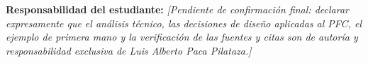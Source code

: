 \documentclass[11pt,a4paper]{article}
\begin{document}
\noindent\textbf{Responsabilidad del estudiante:} \textit{[Pendiente de confirmaci\'on final: declarar expresamente que el an\'alisis t\'ecnico, las decisiones de dise\~no aplicadas al PFC, el ejemplo de primera mano y la verificaci\'on de las fuentes y citas son de autor\'ia y responsabilidad exclusiva de Luis Alberto Paca Pilataza.]}

\clearpage

\printbibliography[title={Referencias}]
\end{document}
